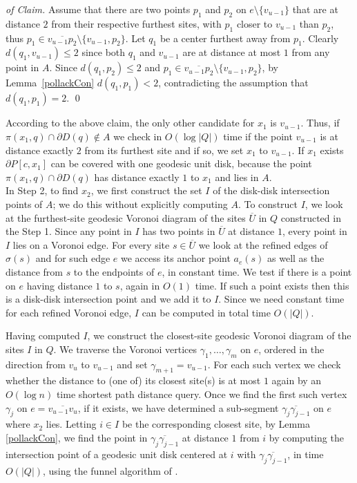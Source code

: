 \documentclass{llncs}
\begin{document}
\begin{proof} [of Claim]
Assume that there are two points $p_1$ and $p_2$ on $e\setminus\{v_{u-1}\}$ that are at distance $2$ from their respective furthest sites, with $p_1$ closer to $v_{u-1}$ than $p_2$, thus $p_1 \in \overline{v_{u-1}p_2} \setminus \{v_{u-1}, p_2\}$.  Let $q_1$ be a center furthest away from $p_1$. Clearly $d(q_1, v_{u-1}) \leq 2$ since both $q_1$ and $v_{u-1}$ are at distance at most $1$ from any point in $A$. Since $d(q_1, p_2) \leq 2$ and $p_1 \in \overline{v_{u-1}p_2} \setminus \{v_{u-1}, p_2\}$, by Lemma~\ref{pollackCon} $d(q_1, p_1) < 2$, contradicting the assumption that $d(q_1, p_1) = 2$. \qed
\end{proof}


According to the above claim, the only other candidate for $x_1$ is $v_{u-1}$. 
Thus, if $\pi(x_1,q) \cap \partial D(q) \notin A$ we check in $O(\log |Q|)$ time if the point $v_{u-1}$ is at distance exactly $2$ from its furthest site and if so, we set $x_1$ to $v_{u-1}$. If $x_1$ exists $\partial P[c,x_1]$ can be covered with one geodesic unit disk, because the point $\pi(x_1,q) \cap \partial D(q)$ has distance exactly $1$ to $x_1$ and lies in $A$.   \\

In Step 2, to find $x_2$, we first construct the set $I$ of the disk-disk intersection points of $A$; we do this without explicitly computing $A$. To construct $I$, we look at the furthest-site geodesic Voronoi diagram of the sites $\overline{U}$ in $Q$ constructed in the Step 1. Since any point in $I$ has two points in $\overline{U}$ at distance $1$, every point in $I$ lies on a Voronoi edge. For every site $s \in \overline{U}$ we look at the refined edges of $\sigma(s)$ and for such edge $e$ we access its anchor point $a_e(s)$ as well as the distance from $s$ to the endpoints of $e$, in constant time. We test if there is a point on $e$ having distance $1$ to $s$, again in $O(1)$ time. If such a point exists then this is a disk-disk intersection point and we add it to $I$. Since we need constant time for each refined Voronoi edge, $I$ can be computed in total time $O(|Q|)$.

Having computed $I$, we construct the closest-site geodesic Voronoi diagram of the sites  $I$  in $Q$. We traverse the Voronoi vertices $\gamma_1, \ldots, \gamma_m$ on $e$, ordered in the direction from $v_{u}$  to $v_{u-1}$ and set $\gamma_{m+1} =  v_{u-1}$. For each such vertex we check whether the distance to (one of) its closest site(s) is at most $1$ again by an $O(\log n)$ time shortest path distance query. Once we find the first such vertex $\gamma_j$ on $e = \overline{v_{u-1}v_{u}}$, if it exists, we have determined a sub-segment $\overline{\gamma_j\gamma_{j-1}}$ on $e$ where $x_2$ lies. Letting $i \in I$ be the corresponding closest site, by Lemma  \ref{pollackCon}, we find the point in $\overline{\gamma_j\gamma_{j-1}}$  at distance $1$ from $i$ by computing the intersection point of a geodesic unit disk centered at $i$ with $\overline{\gamma_j\gamma_{j-1}}$, in time $O(|Q|)$, using the funnel algorithm of \cite{lineshortpath}.
\end{document}
